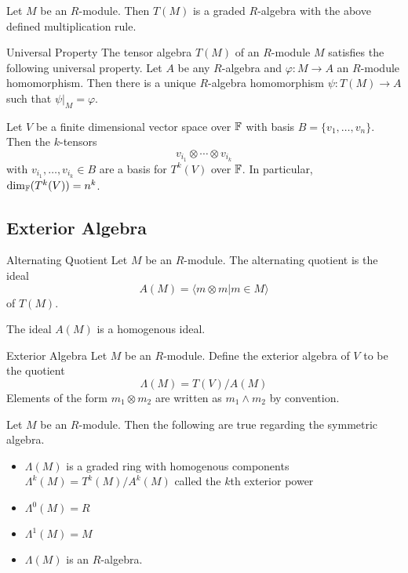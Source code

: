 \documentclass[a4paper]{article}
\begin{document}
\begin{prp}{}{} Let $M$ be an $R$-module. Then $T(M)$ is a graded $R$-algebra with the above defined multiplication rule. 
\end{prp}

\begin{prp}{Universal Property}{} The tensor algebra $T(M)$ of an $R$-module $M$ satisfies the following universal property. Let $A$ be any $R$-algebra and $\varphi:M\to A$ an $R$-module homomorphism. Then there is a unique $R$-algebra homomorphism $\psi:T(M)\to A$ such that $\psi|_M=\varphi$. 
\end{prp}

\begin{prp}{}{} Let $V$ be a finite dimensional vector space over $\mathbb{F}$ with basis $B=\{v_1,\dots,v_n\}$. Then the $k$-tensors $$v_{i_1}\otimes\cdots\otimes v_{i_k}$$ with $v_{i_1},\dots,v_{i_k}\in B$ are a basis for $T^k(V)$ over $\mathbb{F}$. In particular, $\dim_{\mathbb{F}}(T^k(V))=n^k$. 
\end{prp}

\subsection{Exterior Algebra}
\begin{defn}{Alternating Quotient}{} Let $M$ be an $R$-module. The alternating quotient is the ideal $$A(M)=\langle m\otimes m|m\in M\rangle$$ of $T(M)$. 
\end{defn}

\begin{lmm}{}{} The ideal $A(M)$ is a homogenous ideal. 
\end{lmm}

\begin{defn}{Exterior Algebra}{} Let $M$ be an $R$-module. Define the exterior algebra of $V$ to be the quotient $$\Lambda(M)=T(V)/A(M)$$ Elements of the form $m_1\otimes m_2$ are written as $m_1\wedge m_2$ by convention. 
\end{defn}

\begin{prp}{}{} Let $M$ be an $R$-module. Then the following are true regarding the symmetric algebra. 
\begin{itemize}
\item $\Lambda(M)$ is a graded ring with homogenous components $\Lambda^k(M)=T^k(M)/A^k(M)$ called the $k$th exterior power
\item $\Lambda^0(M)=R$
\item $\Lambda^1(M)=M$
\item $\Lambda(M)$ is an $R$-algebra. 
\end{itemize}
\end{prp}
\end{document}
